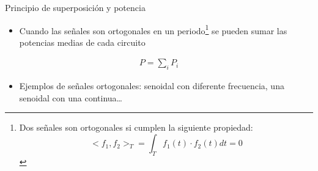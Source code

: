 \documentclass[aspectratio=169, usenames,svgnames,dvipsnames]{beamer}
\begin{document}

\begin{frame}{Principio de superposición y potencia}
    \begin{itemize}
        \item Cuando las señales son \alert{ortogonales en un periodo}\footnote{Dos señales son ortogonales si cumplen la siguiente propiedad: \[<f_1, f_2>_T = \int_T f_1(t) \cdot f_2(t) dt = 0\]} se pueden sumar las \alert{potencias medias} de cada circuito
    \end{itemize}
    \begin{align*}
      P = \sum_i P_i
    \end{align*}
    \begin{itemize}
        \item Ejemplos de señales ortogonales: senoidal con diferente frecuencia, una senoidal con una continua\ldots{}
    \end{itemize}
\end{frame}

\end{document}
